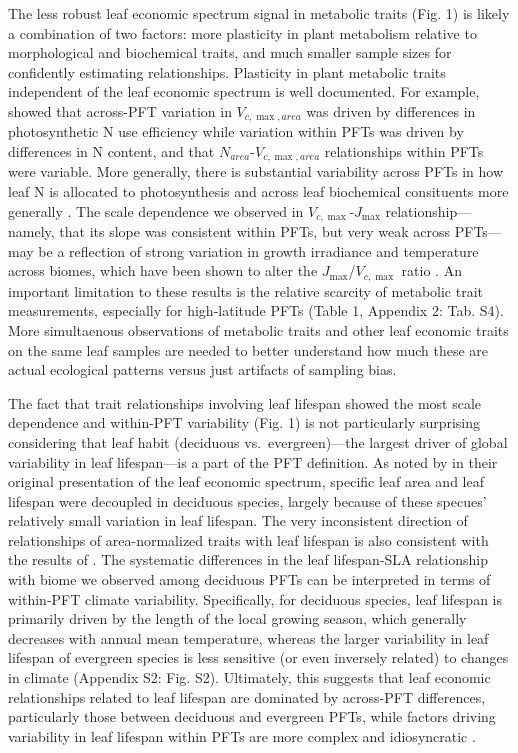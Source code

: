 \documentclass{article}
\begin{document}
The less robust leaf economic spectrum signal in metabolic traits (Fig. 1) is likely a combination of two factors:
more plasticity in plant metabolism relative to morphological and biochemical traits,
and much smaller sample sizes for confidently estimating relationships.
Plasticity in plant metabolic traits independent of the leaf economic spectrum is well documented.
For example, \citealt{kattge_2009_quantifying} showed that across-PFT variation in $V_{c,\max,area}$ was driven by differences in photosynthetic N use efficiency while variation within PFTs was driven by differences in N content, and that $N_{area}$-$V_{c,\max,area}$ relationships within PFTs were variable.
More generally, there is substantial variability across PFTs in how leaf N is allocated to photosynthesis \citep{ghimire_2017_global} and across leaf biochemical consituents more generally \citep{onoda_2011_global}.
The scale dependence we observed in $V_{c,\max}$-$J_{\max}$ relationship---namely, that its slope was consistent within PFTs, but very weak across PFTs---may be a reflection of strong variation in growth irradiance and temperature across biomes, which have been shown to alter the $J_{\max}$/$V_{c,\max}$ ratio \citep{hikosaka_2005_nitrogen,hikosaka_2005_temperature,xiang_2013_contrasting}.
An important limitation to these results is the relative scarcity of metabolic trait measurements, especially for high-latitude PFTs (Table 1, Appendix 2: Tab. S4).
More simultaenous observations of metabolic traits and other leaf economic traits on the same leaf samples are needed to better understand how much these are actual ecological patterns versus just artifacts of sampling bias.

The fact that trait relationships involving leaf lifespan showed the most scale dependence and within-PFT variability (Fig. 1) is not particularly surprising considering that leaf habit (deciduous vs.\ evergreen)---the largest driver of global variability in leaf lifespan---is a part of the PFT definition.
As noted by \citealt{wright_2004_worldwide} in their original presentation of the leaf economic spectrum, specific leaf area and leaf lifespan were decoupled in deciduous species, largely because of these specues' relatively small variation in leaf lifespan.
The very inconsistent direction of relationships of area-normalized traits with leaf lifespan is also consistent with the results of \citealt{wright_2004_worldwide}.
The systematic differences in the leaf lifespan-SLA relationship with biome we observed among deciduous PFTs can be interpreted in terms of within-PFT climate variability.
Specifically, for deciduous species, leaf lifespan is primarily driven by the length of the local growing season, which generally decreases with annual mean temperature, whereas the larger variability in leaf lifespan of evergreen species is less sensitive (or even inversely related) to changes in climate (Appendix S2: Fig. S2).
Ultimately, this suggests that leaf economic relationships related to leaf lifespan are dominated by across-PFT differences, particularly those between deciduous and evergreen PFTs, while factors driving variability in leaf lifespan within PFTs are more complex and idiosyncratic \citep{reich_2014_biogeographic,wu_2016_leaf}.
\end{document}
